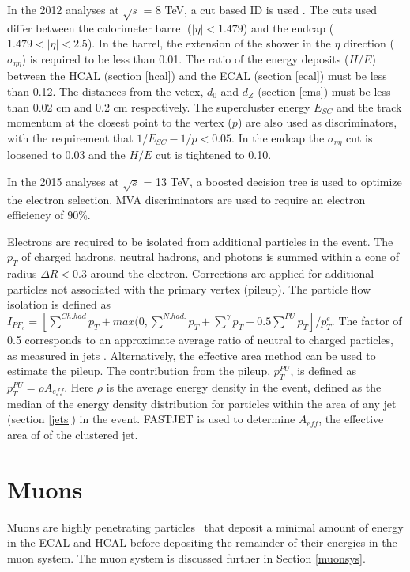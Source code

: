 \documentclass[oneside, letterpaper, oldfontcommands]{memoir}
\begin{document}
\qquad In the 2012 analyses at $\sqrt{s}$ = 8 TeV, a cut based ID is used \cite{Khachatryan:2015hwa}. The cuts used differ between the calorimeter barrel ($|\eta| < 1.479$) and the endcap ($1.479 < |\eta| < 2.5$). In the barrel, the extension of the shower in the $\eta$ direction ($\sigma_{\eta\eta}$) is required to be less than 0.01. The ratio of the energy deposits ($H/E$) between the HCAL (section \ref{hcal}) and the ECAL (section \ref{ecal}) must be less than 0.12.    The distances from the vetex, $d_{0}$ and $d_{Z}$ (section \ref{cms}) must be less than 0.02 cm and 0.2 cm respectively. The supercluster energy $E_{SC}$ and the track momentum at the closest point to the vertex ($p$) are also used as discriminators, with the requirement that $1/E_{SC} - 1/p < 0.05$. In the endcap the $\sigma_{\eta\eta}$ cut is loosened to 0.03 and the $H/E$ cut is tightened to 0.10.

\qquad In the 2015 analyses at $\sqrt{s}$ = 13 TeV, a boosted decision tree is used to optimize the electron selection. MVA discriminators are used to require an electron efficiency of 90\%.

\qquad Electrons are required to be isolated from additional particles in the event. The $p_{T}$ of charged hadrons, neutral hadrons, and photons is summed within a cone of radius $\Delta R < 0.3$ around the electron.  Corrections are applied for additional particles not associated with the primary vertex (pileup). The particle flow isolation is defined as $I_{PF_{e}} = [\sum\limits^{Ch. had} p_{T} + max(0, \sum\limits^{N. had.} p_{T} + \sum\limits^{\gamma} p_{T} - 0.5 \sum\limits^{PU} p_{T}]/p_{T}^{e}$. The factor of 0.5 corresponds to an approximate average ratio of neutral to charged particles, as measured in jets \cite{CMS-PAS-PFT-10-002}. Alternatively, the effective area method can be used to estimate the pileup. The contribution from the pileup, $p_{T}^{PU}$, is defined as $p_{T}^{PU} = \rho A_{eff}$. Here $\rho$ is the average energy density in the event, defined as the median of the energy density distribution for particles within the area of any jet (section \ref{jets}) in the event.\cite{Khachatryan:2015hwa} FASTJET \cite{Cacciari:2011ma} is used to determine $A_{eff}$, the effective area of of the clustered jet.  


\section{Muons}\label{muons}
\qquad Muons are highly penetrating particles~\cite{Agashe:2014kda} that deposit a minimal amount of energy in the ECAL and HCAL before depositing the remainder of their energies in the muon system. The muon system is discussed further in Section \ref{muonsys}. 
\end{document}
